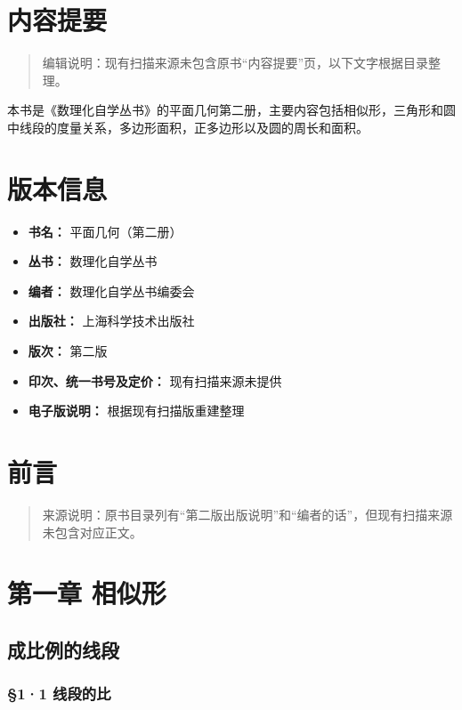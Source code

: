 \chapter*{内容提要}

\begin{quote}
编辑说明：现有扫描来源未包含原书``内容提要''页，以下文字根据目录整理。
\end{quote}

本书是《数理化自学丛书》的平面几何第二册，主要内容包括相似形，三角形和圆中线段的度量关系，多边形面积，正多边形以及圆的周长和面积。

\chapter*{版本信息}

\begin{itemize}
\item
  \textbf{书名：} 平面几何（第二册）
\item
  \textbf{丛书：} 数理化自学丛书
\item
  \textbf{编者：} 数理化自学丛书编委会
\item
  \textbf{出版社：} 上海科学技术出版社
\item
  \textbf{版次：} 第二版
\item
  \textbf{印次、统一书号及定价：} 现有扫描来源未提供
\item
  \textbf{电子版说明：} 根据现有扫描版重建整理
\end{itemize}

\chapter{前言}

\begin{quote}
来源说明：原书目录列有``第二版出版说明''和``编者的话''，但现有扫描来源未包含对应正文。
\end{quote}

\chapter{第一章 相似形}

\section{成比例的线段}

\subsection{§1·1 线段的比}

